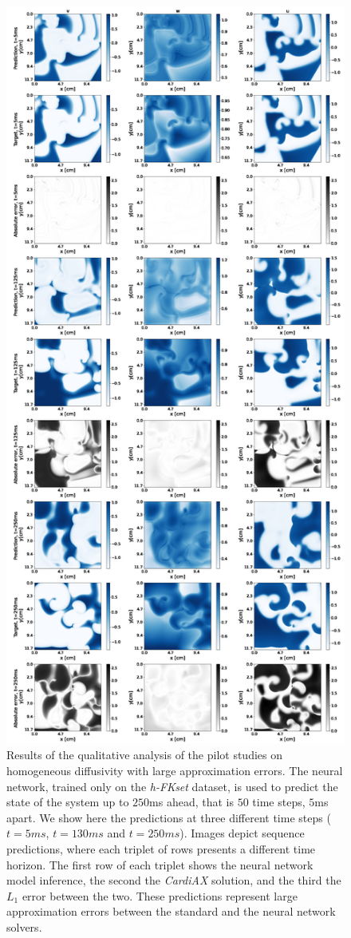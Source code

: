 \documentclass[utf8]{frontiers_suppmat} %
\begin{document}
\begin{figure}[!htp]
\centering
\includegraphics[width=.52\textwidth]{figures/old_figures/Figure-4.jpg}
\caption{Results of the qualitative analysis of the pilot studies on homogeneous diffusivity with large approximation errors. The neural network, trained only on the \textit{h-FKset} dataset, is used to predict the state of the system up to $250$ms ahead, that is $50$ time steps, $5$ms apart. We show here the predictions at three different time steps ($t=5ms$, $t=130ms$ and $t=250ms$). Images depict sequence predictions, where each triplet of rows presents a different time horizon. The first row of each triplet shows the neural network model inference, the second the \textit{CardiAX} solution, and the third the $L_1$ error between the two.
These predictions represent large approximation errors between the standard and the neural network solvers.}\label{fig:scarfreequalitativemax}
\end{figure}
\end{document}
